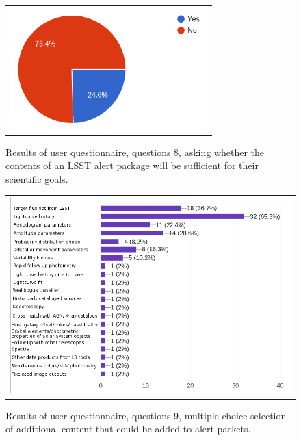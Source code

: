 \documentclass{article}
\begin{document}
\begin{figure}[ht]
\centering
\begin{tabular}{c}
\includegraphics[width=3in]{figures/user_question_8.png}
\end{tabular}
\caption{Results of user questionnaire, questions 8, asking whether the contents of an LSST alert package will be sufficient for their scientific goals. \label{fig:Q8results}}
\label{fig:alert_content1}
\end{figure}

\begin{figure}[ht]
\centering
\begin{tabular}{c}
\includegraphics[width=6in]{figures/user_question_9.png}
\end{tabular}
\caption{Results of user questionnaire, questions 9, multiple choice selection of additional content that could be added to alert packets. \label{fig:Q9results}}
\label{fig:alert_content2}
\end{figure}
\end{document}
